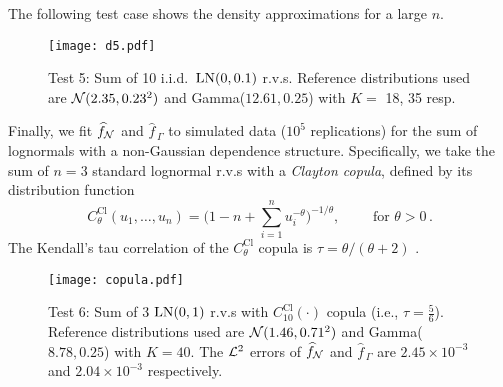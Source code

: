

The following test case shows the density approximations for a large $n$.


\begin{figure}[H]
\centering
\texttt{[image: d5.pdf]}
\caption*{Test 5: Sum of 10 i.i.d.\ $\mathrm{LN}(0,0.1)$ r.v.s. Reference distributions used are $\mathcal{N}(2.35,0.23^2)$ and Gamma($12.61,0.25$) with $K =$ 18, 35 resp.}
\end{figure}


Finally, we fit $\widehat{f}_{\mathcal{N}}$ and $\widehat{f}_{\,\Gamma}$ to simulated data ($10^5$ replications) for the sum of lognormals with a non-Gaussian dependence structure. Specifically, we take the sum of $n = 3$ standard lognormal r.v.s with a \emph{Clayton copula}, defined by its distribution function
\[
C^{\text{Cl}}_\theta(u_1, \dots, u_n) = \Big( 1 - n + \sum_{i=1}^n u_i^{-\theta} \Big)^{-1/\theta}, \qquad \text{ for } \theta > 0 \,.
\]
The Kendall's tau correlation of the $C^{\text{Cl}}_\theta$ copula is $\tau = \theta / (\theta + 2)$ \cite{mcneil2015quantitative}.

\begin{figure}
\centering
\texttt{[image: copula.pdf]}
\caption*{Test 6: Sum of 3 $\mathrm{LN}(0,1)$ r.v.s with $C^{\text{Cl}}_{10}(\cdot)$ copula (i.e., $\tau = \frac56$). Reference distributions used are $\mathcal{N}(1.46,0.71^2)$ and Gamma($8.78,0.25$) with $K = 40$. The $\mathcal{L}^2$ errors of $\widehat{f}_{\mathcal{N}}$ and $\widehat{f}_{\,\Gamma}$ are $2.45 \times 10^{-3}$ and $2.04 \times 10^{-3}$ respectively.}
\end{figure}





